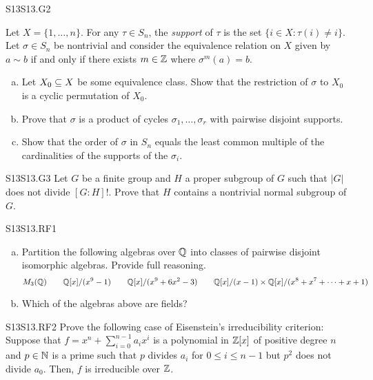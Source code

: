\documentclass[../AlgebraQualSolutions.tex]{subfiles}
\begin{document}
\begin{prob}{S13}{S13.G2}

	Let  $X = \{1,\ldots, n\}$. For any $\tau \in S_n$, the \emph{support} of $\tau$ is the set $\{i \in X: \tau(i) \neq i\}$. Let $\sigma \in S_n$ be nontrivial and consider the equivalence relation on $X$ given by $a \sim b$ if and only if there exists $m \in \mathbb{Z}$ where $\sigma^m(a) = b$.

	\begin{enumerate}[(a)]
		\item Let $X_0 \subseteq X$ be some equivalence class. Show that the restriction of $\sigma$ to $X_0$ is a cyclic permutation of $X_0$.
		\item Prove that $\sigma$ is a product of cycles $\sigma_1,\ldots,\sigma_r$ with pairwise disjoint supports.
		\item Show that the order of $\sigma$ in $S_n$ equals the least common multiple of the cardinalities of the supports of the $\sigma_i$.
	\end{enumerate}
\end{prob}

\begin{prob}{S13}{S13.G3}
	Let $G$ be a finite group and $H$ a proper subgroup of $G$ such that $|G|$ does not divide $[G:H]!$. Prove that $H$ contains a nontrivial normal subgroup of $G$.
\end{prob}

\begin{prob}{S13}{S13.RF1}

	\begin{enumerate}[(a)]
		\item Partition the following algebras over $\mathbb{Q}$ into classes of pairwise disjoint isomorphic algebras. Provide full reasoning.
			\[M_3(\mathbb{Q}) \quad  \quad \mathbb{Q}[x]/(x^9 - 1) \quad \quad \mathbb{Q}[x]/(x^9 + 6x^2 - 3) \quad  \quad \mathbb{Q}[x]/(x-1) \times \mathbb{Q}[x]/(x^8 + x^7 + \cdots + x + 1)\]
		\item Which of the algebras above are fields?
	\end{enumerate}
\end{prob}

\begin{prob}{S13}{S13.RF2}
	Prove the following case of Eisenstein's irreducibility criterion: Suppose that $f = x^n + \sum_{i=0}^{n-1} a_i x^i$ is a polynomial in $\mathbb{Z}[x]$ of positive degree $n$ and $p \in \mathbb{N}$ is a prime such that $p$ divides $a_i$ for $0 \leq i \leq n - 1$ but $p^2$ does not divide $a_0$. Then, $f$ is irreducible over $\mathbb{Z}$.
\end{prob}
\end{document}

